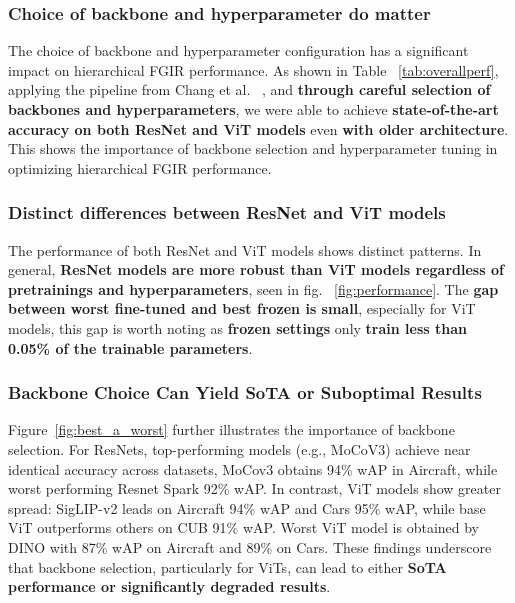\documentclass[10pt,twocolumn]{article}
\begin{document}
\subsubsection{Choice of backbone and hyperparameter do matter}
The choice of backbone and hyperparameter configuration has a significant impact on hierarchical FGIR performance. As shown in Table ~\ref{tab:overallperf}, applying the pipeline from Chang et al.~\cite{chang_your_2021} , and \textbf{through careful selection of backbones and hyperparameters}, we were able to achieve \textbf{state-of-the-art accuracy on both ResNet and ViT models} even \textbf{with older architecture}. This shows the importance of backbone selection and hyperparameter tuning in optimizing hierarchical FGIR performance.

\vspace{-0.2cm}
\subsubsection{Distinct differences between ResNet and ViT models}
The performance of both ResNet and ViT models shows distinct patterns. In general, \textbf{ResNet models are more robust than ViT models regardless of pretrainings and hyperparameters}, seen in fig. ~\ref{fig:performance}. The \textbf{gap between worst fine-tuned and best frozen is small}, especially for ViT models, this gap is worth noting as \textbf{frozen settings} only \textbf{train less than 0.05\% of the trainable parameters}.

\vspace{-0.2cm}
\subsubsection{Backbone Choice Can Yield SoTA or Suboptimal Results}
Figure~\ref{fig:best_a_worst} further illustrates the importance of backbone selection. For ResNets, top-performing models (e.g., MoCoV3) achieve near identical accuracy across datasets, MoCov3 obtains 94\% wAP in Aircraft, while worst performing Resnet Spark 92\% wAP. In contrast, ViT models show greater spread: SigLIP-v2 leads on Aircraft 94\% wAP and Cars 95\% wAP, while base ViT outperforms others on CUB 91\% wAP. Worst ViT model is obtained by DINO with 87\% wAP on Aircraft and 89\% on Cars. These findings underscore that backbone selection, particularly for ViTs, can lead to either \textbf{SoTA performance or significantly degraded results}.
\end{document}
